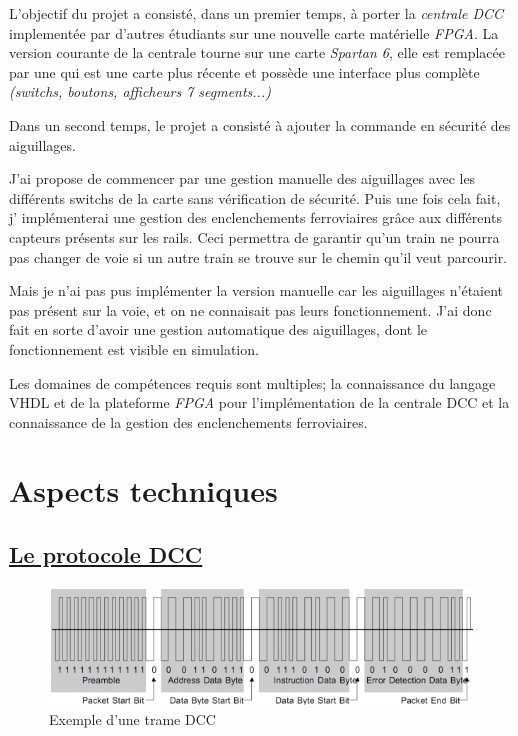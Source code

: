 L'objectif du projet a consisté, dans un premier temps, à porter la
\emph{centrale DCC} implement\'ee par d'autres \'etudiants sur une nouvelle
carte mat\'erielle \emph{FPGA}. La version courante de la centrale tourne sur
une carte \emph{Spartan 6}, elle est remplac\'ee par une \crt qui est
une carte plus r\'ecente et possède une interface plus complète
\emph{(switchs, boutons, afficheurs 7 segments...)}

Dans un second temps, le projet a consisté à ajouter la commande en
sécurité des aiguillages.

J'ai propose de commencer par une gestion manuelle des aiguillages avec
les diff\'erents switchs de la carte sans v\'erification de
s\'ecurit\'e.
Puis une fois cela fait, j' impl\'ementerai une gestion des
enclenchements ferroviaires grâce aux différents capteurs pr\'esents sur
les rails. Ceci permettra de garantir qu'un train ne pourra pas
changer de voie si un autre train se trouve sur le chemin
qu'il veut parcourir. 


Mais je n'ai pas pus implémenter la version manuelle car les
aiguillages n'étaient pas présent sur la voie, et on ne connaisait pas
leurs fonctionnement.
J'ai donc fait en sorte d'avoir une gestion automatique des
aiguillages, dont le fonctionnement est visible en simulation.


Les domaines de comp\'etences requis sont multiples; la connaissance
du langage VHDL et de la plateforme \emph{FPGA} pour l'impl\'ementation
de la centrale DCC et la connaissance de la gestion des enclenchements
ferroviaires.


\newpage
\section{Aspects techniques}
\label{sec:asp_tech}

\subsection{\underline{Le protocole DCC}}
\label{sec:dcc}


\begin{figure}[h]
\centering
\includegraphics[scale=0.75]{trame.png}
\caption{Exemple d'une trame DCC}
\label{fig1}
\end{figure}

